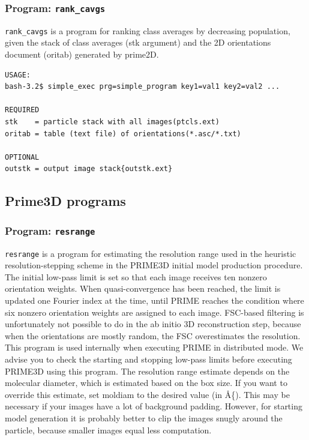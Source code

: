 \documentclass[a4paper,11pt]{article}
\newcommand{\prgname}[1]{\textcolor{NavyBlue}{\texttt{#1}}}
\begin{document}
\subsubsection{Program: \prgname{rank\_cavgs}}
\label{rank_cavgs}
\prgname{rank\_cavgs} is a program for ranking class averages by decreasing population, given the stack of class averages (stk argument) and the 2D orientations document (oritab) generated by prime2D.

\begin{verbatim}
USAGE:
bash-3.2$ simple_exec prg=simple_program key1=val1 key2=val2 ...

REQUIRED
stk    = particle stack with all images(ptcls.ext)
oritab = table (text file) of orientations(*.asc/*.txt)

OPTIONAL
outstk = output image stack{outstk.ext}
\end{verbatim}

\subsection{Prime3D programs}

\subsubsection{Program: \prgname{resrange}}
\label{resrange}
\prgname{resrange} is a program for estimating the resolution range used in the heuristic resolution-stepping scheme in the PRIME3D initial model production procedure. The initial low-pass limit is set so that each image receives ten nonzero orientation weights. When quasi-convergence has been reached, the limit is updated one Fourier index at the time, until PRIME reaches the condition where six nonzero orientation weights are assigned to each image. FSC-based filtering is unfortunately not possible to do in the ab initio 3D reconstruction step, because when the orientations are mostly random, the FSC overestimates the resolution. This program is used internally when executing PRIME in distributed mode. We advise you to check the starting and stopping low-pass limits before executing PRIME3D using this program. The resolution range estimate depends on the molecular diameter, which is estimated based on the box size. If you want to override this estimate, set moldiam to the desired value (in \AA\{). This may be necessary if your images have a lot of background padding. However, for starting model generation it is probably better to clip the images snugly around the particle, because smaller images equal less computation.
\end{document}
